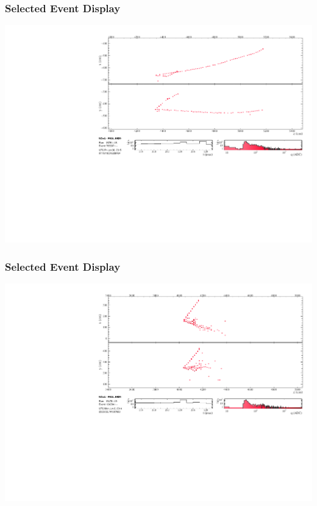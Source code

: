 \documentclass[10pt,professionalfonts,xcolor=table]{beamer}
\begin{document}
\begin{frame}
\frametitle{Selected Event Display}
\includegraphics[angle=-90, width=1\textwidth]{figures/results/evd/evd_xzyx-proj_18791_765587.pdf}
\end{frame}

\begin{frame}
\frametitle{Selected Event Display}
\includegraphics[angle=-90, width=1\textwidth]{figures/results/evd/evd_xzyx-proj_15470_124284.pdf}
\end{frame}
\end{document}
